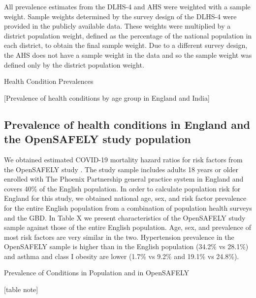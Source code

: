\documentclass[10pt,letterpaper]{article}
\numberwithin{equation}{section}
\begin{document}
All prevalence estimates from the DLHS-4 and AHS were weighted with a sample weight. Sample weights determined by the survey design of the DLHS-4 were provided in the publicly available data. These weights were multiplied by a district population weight, defined as the percentage of the national population in each district, to obtain the final sample weight. Due to a different survey design, the AHS does not have a sample weight in the data and so the sample weight was defined only by the district population weight.

\clearpage
\begin{landscape}
    \begin{table}[H]
    \begin{center}
     \caption{Health Condition Prevalences}
     
     
     \footnotesize{[Prevalence of health conditions by age group in England and India]}
    \end{center}
   \end{table}
\end{landscape}

\subsection{Prevalence of health conditions in England and the OpenSAFELY study population}
We obtained estimated COVID-19 mortality hazard ratios for risk factors from the OpenSAFELY study \cite{williamson_opensafely_2020}. The study sample includes adults 18 years or older enrolled with The Phoenix Partnership general practice system in England and covers 40\% of the English population. In order to calculate population risk for England for this study, we obtained national age, sex, and risk factor prevalence for the entire English population from a combination of population health surveys and the GBD. In Table X we present characteristics of the OpenSAFELY study sample against those of the entire English population. Age, sex, and prevalence of most risk factors are very similar in the two. Hypertension prevalence in the OpenSAFELY sample is higher than in the English population (34.2\% vs 28.1\%) and asthma and class I obesity are lower (1.7\% vs 9.2\% and 19.1\% vs 24.8\%).


  \begin{table}[H]
    \begin{center}
    \caption{Prevalence of Conditions in Population and in OpenSAFELY}
    
    
    \footnotesize{[table note]}
    \end{center}
  \end{table}
\end{document}
